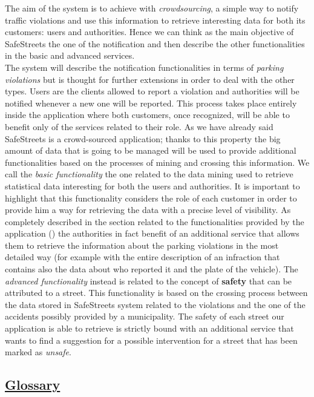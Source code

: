 		The aim of the system is to achieve with \emph{crowdsourcing}, a simple way to notify traffic violations and use this information to retrieve interesting data for both its customers: users and authorities. Hence we can think as the main objective of SafeStreets the one of the notification and then describe the other functionalities in the basic and advanced services.\\
		
		The system will describe the notification functionalities in terms of \emph{parking violations} but is thought for further extensions in order to deal with the other types. Users are the clients allowed to report a violation and authorities will be notified whenever a new one will be reported. This process takes place entirely inside the application where both customers, once recognized, will be able to benefit only of the services related to their role. As we have already said SafeStreets is a crowd-sourced application; thanks to this property the big amount of data that is going to be managed will be used to provide additional functionalities based on the processes of mining and crossing this information. We call the \emph{basic functionality} the one related to the data mining used to retrieve statistical data interesting for both the users and authorities. It is important to highlight that this functionality considers the role of each customer in order to provide him a way for retrieving the data with a precise level of visibility. As completely described in the section related to the functionalities provided by the application () the authorities in fact benefit of an additional service that allows them to retrieve the information about the parking violations in the most detailed way (for example with the entire description of an infraction that contains also the data about who reported it and the plate of the vehicle). The \emph{advanced functionality} instead is related to the concept of \textbf{safety} that can be attributed to a street. This functionality is based on the crossing process between the data stored in SafeStreets system related to the violations and the one of the accidents possibly provided by a municipality. The safety of each street our application is able to retrieve is strictly bound with an additional service that wants to find a suggestion for a possible intervention for a street that has been marked as \emph{unsafe}.
			
	\subsection[Glossary]{\hyperlink{toc}{Glossary}}
		\label{sec:glossary}
		
